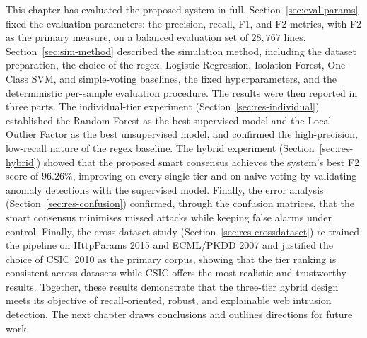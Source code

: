 \documentclass[../main.tex]{subfiles}
\begin{document}
This chapter has evaluated the proposed system in full.
Section~\ref{sec:eval-params} fixed the evaluation parameters: the
precision, recall, F1, and F2 metrics, with F2 as the primary measure, on a
balanced evaluation set of $28{,}767$ lines.
Section~\ref{sec:sim-method} described the simulation method, including the
dataset preparation, the choice of the regex, Logistic Regression, Isolation
Forest, One-Class SVM, and simple-voting baselines, the fixed
hyperparameters, and the deterministic per-sample evaluation procedure. The
results were then reported in three parts. The individual-tier experiment
(Section~\ref{sec:res-individual}) established the Random Forest as the best
supervised model and the Local Outlier Factor as the best unsupervised model,
and confirmed the high-precision, low-recall nature of the regex baseline.
The hybrid experiment (Section~\ref{sec:res-hybrid}) showed that the proposed
smart consensus achieves the system's best F2 score of $96.26\%$, improving on
every single tier and on naive voting by validating anomaly detections with
the supervised model. Finally, the error analysis
(Section~\ref{sec:res-confusion}) confirmed, through the confusion matrices,
that the smart consensus minimises missed attacks while keeping false alarms
under control. Finally, the cross-dataset study
(Section~\ref{sec:res-crossdataset}) re-trained the pipeline on HttpParams
2015 and ECML/PKDD 2007 and justified the choice of CSIC~2010 as the primary
corpus, showing that the tier ranking is consistent across datasets while
CSIC offers the most realistic and trustworthy results. Together, these
results demonstrate that the three-tier hybrid design meets its objective of
recall-oriented, robust, and explainable web intrusion detection. The next
chapter draws conclusions and outlines directions for future work.
\end{document}
